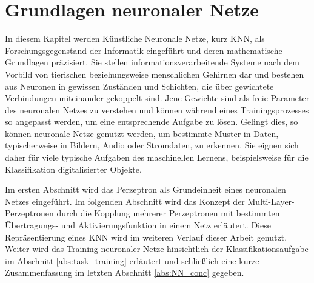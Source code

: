 \chapter{Grundlagen neuronaler Netze}
\label{kap:NN}

In diesem Kapitel werden Künstliche Neuronale Netze\cite{dayhoff1990neural}, kurz KNN, als Forschungsgegenstand der Informatik eingeführt und deren mathematische Grundlagen präzisiert. 
Sie stellen informationsverarbeitende Systeme nach dem Vorbild von tierischen beziehungsweise menschlichen Gehirnen dar und bestehen aus Neuronen in gewissen Zuständen und Schichten, die über gewichtete Verbindungen miteinander gekoppelt sind. Jene Gewichte sind als freie Parameter des neuronalen Netzes zu verstehen und können während eines Trainingsprozesses so angepasst werden, um eine entsprechende Aufgabe zu lösen.  
Gelingt dies, so können neuronale Netze genutzt werden, um bestimmte Muster in Daten, typischerweise in Bildern, Audio oder Stromdaten, zu erkennen\cite{pandya1995pattern, pao1989adaptive, urbaniak2021quality}.
Sie eignen sich daher für viele typische Aufgaben des maschinellen Lernens, beispielsweise für die Klassifikation digitalisierter Objekte.

Im ersten Abschnitt wird das Perzeptron\cite{rosenblatt1958perceptron} als Grundeinheit eines neuronalen Netzes eingeführt. 
Im folgenden Abschnitt wird das Konzept der Multi-Layer-Perzeptronen\cite{werbos1988generalization} durch die Kopplung mehrerer Perzeptronen mit bestimmten Übertragungs- und Aktivierungsfunktion in einem Netz erläutert. Diese Repräsentierung eines KNN wird im weiteren Verlauf dieser Arbeit genutzt. Weiter wird das Training neuronaler Netze hinsichtlich der Klassifikationsaufgabe im Abschnitt \ref{abs:task_training} erläutert und schließlich eine kurze Zusammenfassung im letzten Abschnitt \ref{abs:NN_conc} gegeben.

